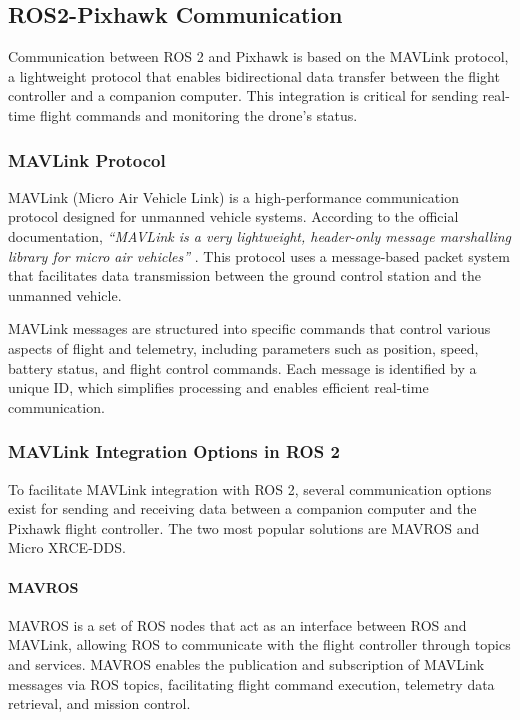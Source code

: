 \subsection{ROS2-Pixhawk Communication}
    Communication between ROS 2 and Pixhawk is based on the MAVLink protocol, a lightweight protocol that enables bidirectional data transfer between the flight controller and a companion computer. This integration is critical for sending real-time flight commands and monitoring the drone's status.
    
        \subsubsection{MAVLink Protocol}
        MAVLink (Micro Air Vehicle Link) is a high-performance communication protocol designed for unmanned vehicle systems. According to the official documentation, \textit{“MAVLink is a very lightweight, header-only message marshalling library for micro air vehicles”} \cite{mavlink_docs}. This protocol uses a message-based packet system that facilitates data transmission between the ground control station and the unmanned vehicle.

        MAVLink messages are structured into specific commands that control various aspects of flight and telemetry, including parameters such as position, speed, battery status, and flight control commands. Each message is identified by a unique ID, which simplifies processing and enables efficient real-time communication.

        \subsubsection{MAVLink Integration Options in ROS 2}
        To facilitate MAVLink integration with ROS 2, several communication options exist for sending and receiving data between a companion computer and the Pixhawk flight controller. The two most popular solutions are MAVROS and Micro XRCE-DDS.

            \paragraph{MAVROS}
            MAVROS is a set of ROS nodes that act as an interface between ROS and MAVLink, allowing ROS to communicate with the flight controller through topics and services. MAVROS enables the publication and subscription of MAVLink messages via ROS topics, facilitating flight command execution, telemetry data retrieval, and mission control.

